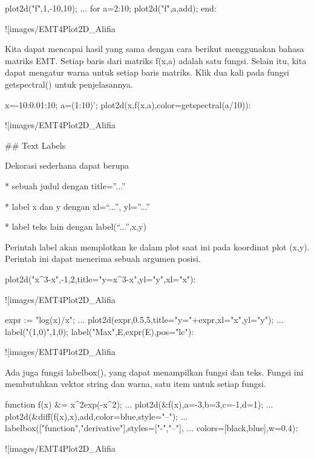 \documentclass{article}
\begin{document}
\>plot2d({{"f",1}},-10,10); ...  
\>   for a=2:10; plot2d({{"f",a}},\>add); end:


![images/EMT4Plot2D_Alifia%

Kita dapat mencapai hasil yang sama dengan cara berikut menggunakan
bahasa matriks EMT. Setiap baris dari matriks f(x,a) adalah satu
fungsi. Selain itu, kita dapat mengatur warna untuk setiap baris
matriks. Klik dua kali pada fungsi getspectral() untuk penjelasannya.


\>x=-10:0.01:10; a=(1:10)'; plot2d(x,f(x,a),color=getspectral(a/10)):


![images/EMT4Plot2D_Alifia%

## Text Labels

Dekorasi sederhana dapat berupa


* 
sebuah judul dengan title=”...”

* 
label x dan y dengan xl=“...”, yl=”...”

* 
label teks lain dengan label(“...”,x,y)


Perintah label akan memplotkan ke dalam plot saat ini pada koordinat
plot (x,y). Perintah ini dapat menerima sebuah argumen posisi.


\>plot2d("x^3-x",-1,2,title="y=x^3-x",yl="y",xl="x"):


![images/EMT4Plot2D_Alifia%

\>expr := "log(x)/x"; ...  
\>     plot2d(expr,0.5,5,title="y="+expr,xl="x",yl="y"); ...  
\>     label("(1,0)",1,0); label("Max",E,expr(E),pos="lc"):


![images/EMT4Plot2D_Alifia%

Ada juga fungsi labelbox(), yang dapat menampilkan fungsi dan teks.
Fungsi ini membutuhkan vektor string dan warna, satu item untuk setiap
fungsi.


\>function f(x) &= x^2\*exp(-x^2);  ...  
\>   plot2d(&f(x),a=-3,b=3,c=-1,d=1);  ...  
\>   plot2d(&diff(f(x),x),\>add,color=blue,style="--"); ...  
\>   labelbox(["function","derivative"],styles=["-","--"], ...  
\>      colors=[black,blue],w=0.4):


![images/EMT4Plot2D_Alifia%
\end{document}

